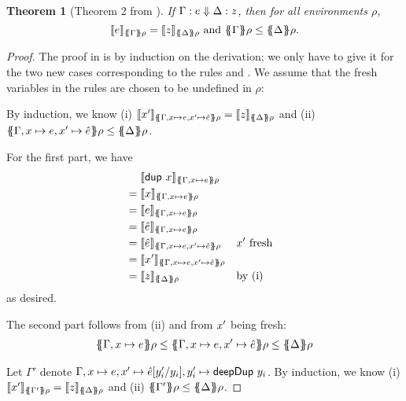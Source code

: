 \documentclass[preprint]{sigplanconf}
\newtheorem{theorem}{Theorem}
\theoremstyle{nonumberplain}
\newtheorem{proof}{Proof}
\begin{document}
\begin{theorem}[Theorem 2 from \citep{launchbury}]
If $\Gamma : e \Downarrow \Delta : z$, then for all environments $\rho$,
\[
\dsem e {\esem \Gamma \rho} = \dsem z {\esem \Delta \rho}
\text{ and }
\esem \Gamma \rho \le \esem \Delta \rho.
\]
\end{theorem}
\begin{proof}
The proof in \citep{launchbury} is by induction on the derivation; we only have to give it for the two new cases corresponding to the rules  and . We assume that the fresh variables in the rules are chosen to be undefined in $\rho$:

By induction, we know (i) $\dsem{\fresh x}{\esem{\Gamma, x \mapsto e, \fresh x \mapsto \hat e} \rho} = \dsem{z}{\esem \Delta \rho}$ and (ii) $\esem{\Gamma, x \mapsto e, \fresh x \mapsto \hat e} \rho \le \esem \Delta \rho$.

For the first part, we have 
\begin{align*}
&\phantom{{}={}}\dsem{\sDup x}{\esem{\Gamma, x\mapsto e}\rho}\\
&= \dsem{x}{\esem{\Gamma, x\mapsto e}\rho}\\
&= \dsem{e}{\esem{\Gamma, x\mapsto e}\rho}\\
&= \dsem{\hat e}{\esem{\Gamma, x\mapsto e}\rho}\\
&= \dsem{\hat e}{\esem{\Gamma, x\mapsto e, \fresh x \mapsto \hat e}\rho} && \text{$\fresh x$ fresh}\\
&= \dsem{\fresh x}{\esem{\Gamma, x\mapsto e, \fresh x \mapsto \hat e}\rho} \\
&= \dsem{z}{\esem \Delta \rho} &&\text{by (i)}
\end{align*}
as desired.

The second part follows from (ii) and from $x'$ being fresh:
\begin{align*}
\esem{\Gamma, x\mapsto e}\rho \le \esem{\Gamma, x\mapsto e, \fresh x\mapsto \hat e} \rho \le \esem{\Delta}\rho
\end{align*}

Let \mbox{$\Gamma'$} denote {$\Gamma, x\mapsto e, x'\mapsto \hat e[y'_i/y_i], y'_i \mapsto \text{\textsf{deepDup}}\ y_i$}.
By induction, we know (i) $\dsem{\fresh x}{\esem{\Gamma'} \rho} = \dsem{z}{\esem \Delta \rho}$ and (ii) $\esem{\Gamma'} \rho \le \esem \Delta \rho$.


\end{proof}
\end{document}
